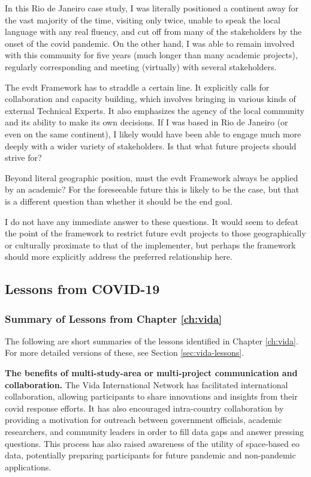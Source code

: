 In this Rio de Janeiro case study, I was literally positioned a continent away for the vast majority of the time, visiting only twice, unable to speak the local language with any real fluency, and cut off from many of the stakeholders by the onset of the \ac{covid} pandemic. On the other hand, I was able to remain involved with this community for five years (much longer than many academic projects), regularly corresponding and meeting (virtually) with several stakeholders. 

The \ac{evdt} Framework has to straddle a certain line. It explicitly calls for collaboration and capacity building, which involves bringing in various kinds of external Technical Experts. It also emphasizes the agency of the local community and its ability to make its own decisions. If I was based in Rio de Janeiro (or even on the same continent), I likely would have been able to engage much more deeply with a wider variety of stakeholders. Is that what future projects should strive for?

Beyond literal geographic position, must the \ac{evdt} Framework always be applied by an academic? For the foreseeable future this is likely to be the case, but that is a different question than whether it should be the end goal.

I do not have any immediate answer to these questions. It would seem to defeat the point of the framework to restrict future \ac{evdt} projects to those geographically or culturally proximate to that of the implementer, but perhaps the framework should more explicitly address the preferred relationship here. 


\subsection{Lessons from COVID-19}

\subsubsection{Summary of Lessons from Chapter \ref{ch:vida}} 

The following are short summaries of the lessons identified in Chapter \ref{ch:vida}. For more detailed versions of these, see Section \ref{sec:vida-lessons}.

\textbf{The benefits of multi-study-area or multi-project communication and collaboration.} The Vida International Network has facilitated international collaboration, allowing participants to share innovations and insights from their \ac{covid} response efforts. It has also encouraged intra-country collaboration by providing a motivation for outreach between government officials, academic researchers, and community leaders in order to fill data gaps and answer pressing questions. This process has also raised awareness of the utility of space-based \ac{eo} data, potentially preparing participants for future pandemic and non-pandemic applications. 


